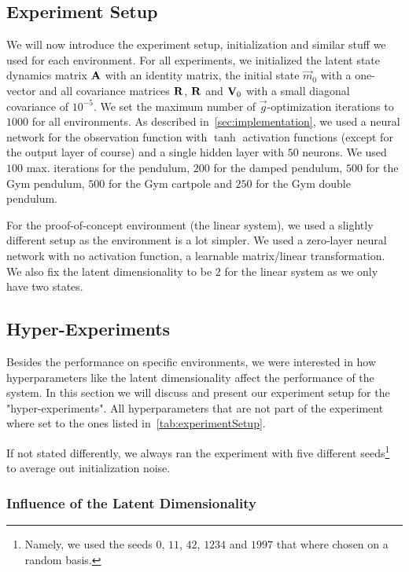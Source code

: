 	\subsection{Experiment Setup}
		We will now introduce the experiment setup, initialization and similar stuff we used for each environment. For all experiments, we initialized the latent state dynamics matrix \( \boldsymbol{\mathrm{A}} \) with an identity matrix, the initial state \( \vec{m}_0 \) with a one-vector and all covariance matrices \( \boldsymbol{\mathrm{R}} \), \( \boldsymbol{\mathrm{R}} \) and \( \boldsymbol{\mathrm{V}}_0 \) with a small diagonal covariance of \( 10^{-5} \). We set the maximum number of \(\vec{g}\)-optimization iterations to \(1000\) for all environments. As described in~\autoref{sec:implementation}, we used a neural network for the observation function with \(\tanh\) activation functions (except for the output layer of course) and a single hidden layer with \(50\) neurons. We used \(100\) max. iterations for the pendulum, \(200\) for the damped pendulum, \(500\) for the Gym pendulum, \(500\) for the Gym cartpole and \(250\) for the Gym double pendulum.

		For the proof-of-concept environment (the linear system), we used a slightly different setup as the environment is a lot simpler. We used a zero-layer neural network with no activation function, \ie a learnable matrix/linear transformation. We also fix the latent dimensionality to be \(2\) for the linear system as we only have two states.

	\subsection{Hyper-Experiments}
		Besides the performance on specific environments, we were interested in how hyperparameters like the latent dimensionality affect the performance of the system. In this section we will discuss and present our experiment setup for the "hyper-experiments". All hyperparameters that are not part of the experiment where set to the ones listed in~\autoref{tab:experimentSetup}.

		If not stated differently, we always ran the experiment with five different seeds\footnote{Namely, we used the seeds \(0\), \(11\), \(42\), \(1234\) and \(1997\) that where chosen on a random basis.} to average out initialization noise.

		\subsubsection{Influence of the Latent Dimensionality}
			\label{subsec:experimentLatentDim}

